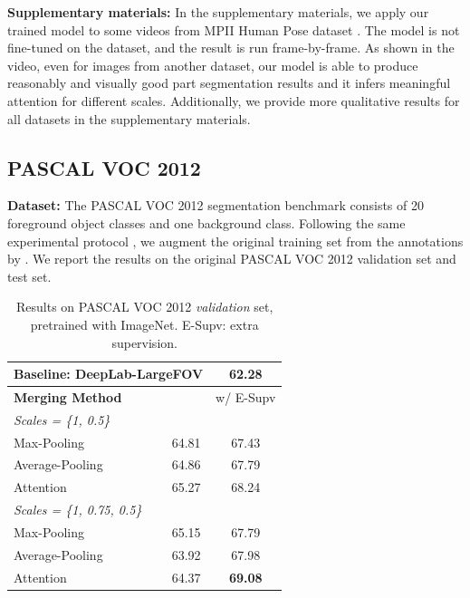 \textbf{Supplementary materials:} In the supplementary materials, we apply our trained model to some videos from MPII Human Pose dataset \cite{andriluka14cvpr}. The model is not fine-tuned on the dataset, and the result is run frame-by-frame. As shown in the video, even for images from another dataset, our model is able to produce reasonably and visually good part segmentation results and it infers meaningful attention for different scales. Additionally, we provide more qualitative results
for all datasets in the supplementary materials.


\subsection{PASCAL VOC 2012}
\textbf{Dataset:} The PASCAL VOC 2012 segmentation benchmark \cite{everingham2014pascal} consists of 20 foreground object classes and one background class. Following the same experimental protocol \cite{chen2014semantic, dai2015boxsup, zheng2015conditional}, we augment the original training set from the annotations by \cite{hariharan2011semantic}. We report the results on the original PASCAL VOC 2012 validation set and test set.

\begin{table}
  \centering
  \addtolength{\tabcolsep}{2.5pt}
    \begin{tabular}{l c c}
      \toprule[0.2 em]
      \multicolumn{2}{l}{Baseline: DeepLab-LargeFOV} & 62.28  \\
      \toprule[0.2 em]
      {\bf Merging Method} & & w/ E-Supv \\
      \midrule \midrule
      {\it Scales = \{1, 0.5\}} & & \\
      Max-Pooling & 64.81 & 67.43 \\
      Average-Pooling & 64.86 & 67.79 \\
      Attention & 65.27 & 68.24 \\
      \midrule
      {\it Scales = \{1, 0.75, 0.5\}} & & \\
      Max-Pooling & 65.15 & 67.79 \\
      Average-Pooling & 63.92 & 67.98 \\
      Attention & 64.37 & {\bf 69.08} \\
      \bottomrule[0.1 em]
    \end{tabular}
    \vspace{1pt}
    \caption{Results on PASCAL VOC 2012 {\it validation} set, pretrained with ImageNet. E-Supv: extra supervision.}
    \label{tab:deeplab_voc12_imagenet}
\end{table}


